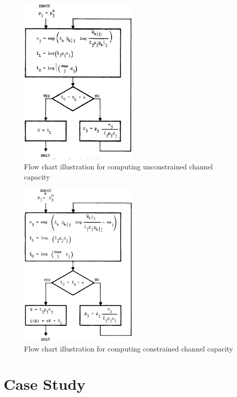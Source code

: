 \documentclass[a4paper,10pt]{article}
\begin{document}
\begin{figure}
 \centering
 \includegraphics[width=0.5\textwidth]{pic/unconstrained_cap.eps}
 \caption{Flow chart illustration for computing unconstrained channel capacity}
 \label{fig:unconstrained_cap}
\end{figure}
\begin{figure}
 \centering
 \includegraphics[width=0.5\textwidth]{pic/constrained_cap.eps}
 \caption{Flow chart illustration for computing constrained channel capacity}
 \label{fig:constrained_cap}
\end{figure}

\section{Case Study}
\label{sec:case_study}
\end{document}
